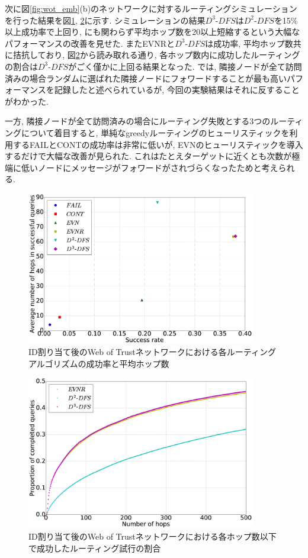 \documentclass[dvipdfmx]{ampbt}
\begin{document}
   次に図\ref{fig:wot_emb}(b)のネットワークに対するルーティングシミュレーションを行った結果を図\ref{fig:succ_hops_full}, \ref{fig:cml_noclip}に示す.  シミュレーションの結果$D^3$-$DFS$は$D^2$-$DFS$を15\%以上成功率で上回り, にも関わらず平均ホップ数を20以上短縮するという大幅なパフォーマンスの改善を見せた. またEVNRと$D^3$-$DFS$は成功率, 平均ホップ数共に拮抗しており, 図\ref{fig:cml_noclip}から読み取れる通り, 各ホップ数内に成功したルーティングの割合は$D^3$-$DFS$がごく僅かに上回る結果となった. \cite{simsek2008navigating}では, 隣接ノードが全て訪問済みの場合ランダムに選ばれた隣接ノードにフォワードすることが最も高いパフォーマンスを記録したと述べられているが, 今回の実験結果はそれに反することがわかった.

   一方, 隣接ノードが全て訪問済みの場合にルーティング失敗とする3つのルーティングについて着目すると, 単純なgreedyルーティングのヒューリスティックを利用するFAILとCONTの成功率は非常に低いが, EVNのヒューリスティックを導入するだけで大幅な改善が見られた. これはたとえターゲットに近くとも次数が極端に低いノードにメッセージがフォワードがされづらくなったためと考えられる.

   \begin{figure}[htbp]
    \centerline{\includegraphics[width=100mm]{../fig/succ_hops_full.eps}}
    \caption{ID割り当て後のWeb of Trustネットワークにおける各ルーティングアルゴリズムの成功率と平均ホップ数}
    \label{fig:succ_hops_full}
   \end{figure}
   \begin{figure}[htbp]
    \centerline{\includegraphics[width=100mm]{../fig/cml_noclip.eps}}
    \caption{ID割り当て後のWeb of Trustネットワークにおける各ホップ数以下で成功したルーティング試行の割合}
    \label{fig:cml_noclip}
   \end{figure}
\end{document}
